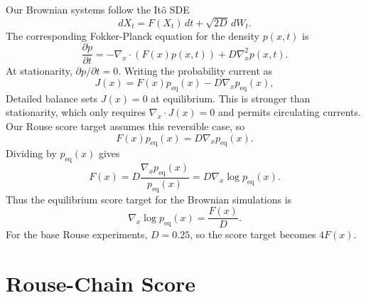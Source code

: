\documentclass[reprint,amsmath,amssymb,aps,pra,10pt]{revtex4-2}
\begin{document}
Our Brownian systems follow the Itô SDE
\begin{equation}
    dX_t
    =
    F(X_t)\,dt
    +
    \sqrt{2D}\,dW_t.
\end{equation}
The corresponding Fokker-Planck equation for the density $p(x,t)$ is
\begin{equation}
    \frac{\partial p}{\partial t}
    =
    -\nabla_x \cdot \left(F(x)p(x,t)\right)
    +
    D\nabla_x^2 p(x,t).
\end{equation}
At stationarity, $\partial p/\partial t=0$.
Writing the probability current as
\begin{equation}
    J(x)
    =
    F(x)p_{\mathrm{eq}}(x)
    -
    D\nabla_x p_{\mathrm{eq}}(x),
\end{equation}
Detailed balance sets $J(x)=0$ at equilibrium. This is stronger than stationarity, which only requires $\nabla_x\cdot J(x)=0$ and permits circulating currents.
Our Rouse score target assumes this reversible case, so
\begin{equation}
    F(x)p_{\mathrm{eq}}(x)
    =
    D\nabla_x p_{\mathrm{eq}}(x).
\end{equation}
Dividing by $p_{\mathrm{eq}}(x)$ gives
\begin{equation}
    F(x)
    =
    D
    \frac{\nabla_x p_{\mathrm{eq}}(x)}
         {p_{\mathrm{eq}}(x)}
    =
    D\nabla_x\log p_{\mathrm{eq}}(x).
\end{equation}
Thus the equilibrium score target for the Brownian simulations is
\begin{equation}
    \nabla_x\log p_{\mathrm{eq}}(x)
    =
    \frac{F(x)}{D}.
\end{equation}
For the base Rouse experiments, $D=0.25$, so the score target becomes $4F(x)$.

\section{Rouse-Chain Score}
\end{document}
